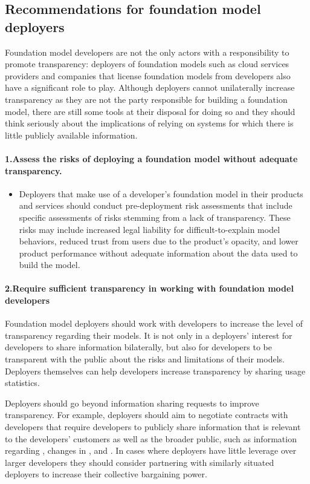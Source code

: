 \hypertarget{recommendations-deployers}{\subsection{Recommendations for foundation model deployers}}
\label{sec:recommendations-deployers}
Foundation model developers are not the only actors with a responsibility to promote transparency: deployers of foundation models such as cloud services providers and companies that license foundation models from developers also have a significant role to play. 
Although deployers cannot unilaterally increase transparency as they are not the party responsible for building a foundation model, there are still some tools at their disposal for doing so and they should think seriously about the implications of relying on systems for which there is little publicly available information. 

\paragraph{1.\phantom{X}Assess the risks of deploying a foundation model without adequate transparency.} 
    \begin{itemize}
        \item Deployers that make use of a developer's foundation model in their products and services should conduct pre-deployment risk assessments that include specific assessments of risks stemming from a lack of transparency. These risks may include increased legal liability for difficult-to-explain model behaviors, reduced trust from users due to the product's opacity, and lower product performance without adequate information about the data used to build the model. 
    \end{itemize}
 \paragraph{2.\phantom{X}Require sufficient transparency in working with foundation model developers} 
    \begin{myitemize}
        \item Foundation model deployers should work with developers to increase the level of transparency regarding their models. 
        It is not only in a deployers' interest for developers to share information bilaterally, but also for developers to be transparent with the public about the risks and limitations of their models. 
        Deployers themselves can help developers increase transparency by sharing usage statistics.
        \item Deployers should go beyond information sharing requests to improve transparency. 
        For example, deployers should aim to negotiate contracts with developers that require developers to publicly share information that is relevant to the developers' customers as well as the broader public, such as information regarding \updates, changes in \usagepolicy, and \impact. 
        In cases where deployers have little leverage over larger developers they should consider partnering with similarly situated deployers to increase their collective bargaining power. 
    \end{myitemize}
